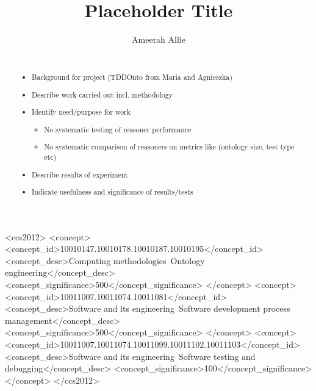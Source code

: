 \documentclass[draft]{sig-alternate-05-2015}
\newcommand{\todo}[1][]{\ifdraft{\ifthenelse{\isempty{#1}}{\hl{(TODO)}}{\hl{(TODO: #1)}}}{}}
\begin{document}
  
  \title{Placeholder Title}
  \author{
    \alignauthor
    Ameerah Allie\\
    \\
  }
  \maketitle

\begin{abstract}
  \todo
  \begin{itemize}
    \item Background for project (TDDOnto from Maria and Agnieszka)
    \item Describe work carried out incl. methodology
    \item Identify need/purpose for work
    \begin{itemize}
      \item No systematic testing of reasoner performance
      \item No systematic comparison of reasoners on metrics like (ontology size, test type etc)
    \end{itemize}
    \item Describe results of experiment
    \item Indicate usefulness and significance of results/tests
  \end{itemize}
\end{abstract}

\begin{CCSXML}
	<ccs2012>
	<concept>
	<concept_id>10010147.10010178.10010187.10010195</concept_id>
	<concept_desc>Computing methodologies~Ontology engineering</concept_desc>
	<concept_significance>500</concept_significance>
	</concept>
	<concept>
	<concept_id>10011007.10011074.10011081</concept_id>
	<concept_desc>Software and its engineering~Software development process management</concept_desc>
	<concept_significance>500</concept_significance>
	</concept>
	<concept>
	<concept_id>10011007.10011074.10011099.10011102.10011103</concept_id>
	<concept_desc>Software and its engineering~Software testing and debugging</concept_desc>
	<concept_significance>100</concept_significance>
	</concept>
	</ccs2012>
\end{CCSXML}

\end{document}
